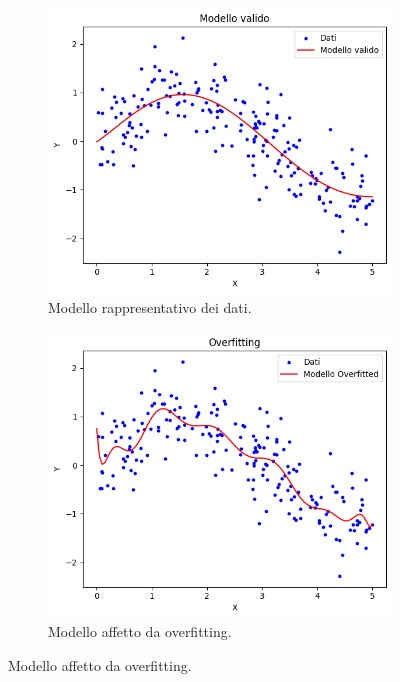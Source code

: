 \documentclass[12pt,a4paper,twoside,openright]{book}
\begin{document}
\begin{figure}[H]
\centering
    \begin{subfigure}[b]{0.3\textwidth}
    \includegraphics[width=\textwidth]{images/valido.png}
    \caption{Modello rappresentativo dei dati.}
    \end{subfigure}
\quad
    \begin{subfigure}[b]{0.3\textwidth}
    \includegraphics[width=\textwidth]{images/overfitting.png}
    \caption{Modello affetto da overfitting.}
    \end{subfigure}

\end{figure}
\end{document}
